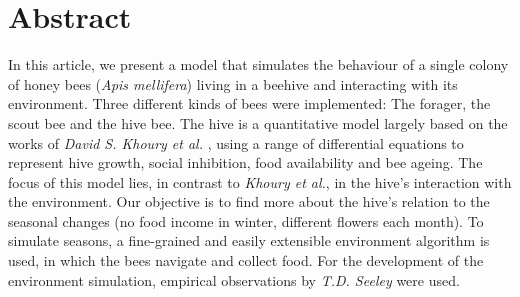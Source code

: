 \section*{Abstract}
In this article, we present a model that simulates the behaviour of a single colony of honey bees (\textit{Apis mellifera}) living in a beehive and interacting with its environment. Three different kinds of bees were implemented: The forager, the scout bee and the hive bee. The hive is a quantitative model largely based on the works of \textit{David S. Khoury et al.} \cite{khoury13}, using a range of differential equations to represent hive growth, social inhibition, food availability and bee ageing. The focus of this model lies, in contrast to \textit{Khoury et al.}, in the hive's interaction with the environment. Our objective is to find more about the hive's relation to the seasonal changes (no food income in winter, different flowers each month). To simulate seasons, a fine-grained and easily extensible environment algorithm is used, in which the bees navigate and collect food. For the development of the environment simulation, empirical observations by \textit{T.D. Seeley} \cite{seeley95} were used.